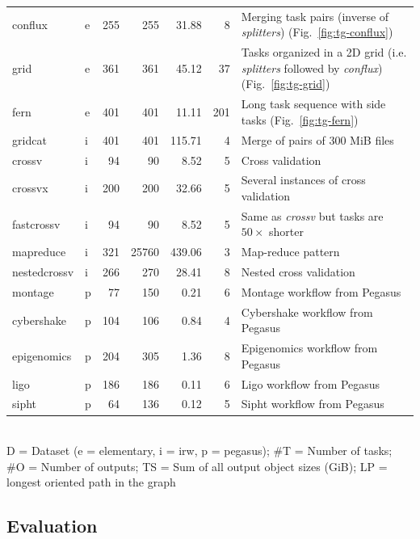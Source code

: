 \begin{table}
\begin{tabular}{l|lrrrr|T}
		conflux &   e &  255 &    255 &   31.88 &    8 &    Merging task pairs
		(inverse of \emph{splitters}) (Fig.~\ref{fig:tg-conflux}) \\
		grid &   e &  361 &    361 &   45.12 &   37 & Tasks organized in a 2D grid
		(i.e. \emph{splitters} followed by \emph{conflux}) (Fig.~\ref{fig:tg-grid})
		\\
		fern &   e &  401 &    401 &   11.11 &  201 &       Long task sequence with
		side tasks (Fig.~\ref{fig:tg-fern}) \\ \hline
		gridcat &   i &  401 &    401 &  115.71 &    4 & Merge of pairs of 300 MiB
		files  \\
		crossv &   i &   94 &     90 &    8.52 &    5 &  Cross validation \\
		crossvx &   i &  200 &    200 &   32.66 &    5 & Several instances of cross
		validation \\
		fastcrossv &   i &   94 &     90 &    8.52 &    5 & Same as \emph{crossv}
		but tasks are $50\times$ shorter \\
		mapreduce &   i &  321 &  25760 &  439.06 &    3 & Map-reduce pattern \\
		nestedcrossv &   i &  266 &    270 &   28.41 &    8 & Nested cross
		validation \\ \hline
		montage &   p &   77 &    150 &    0.21 &    6 &        Montage workflow
		from Pegasus \\
		cybershake &   p &  104 &    106 &    0.84 &    4 &        Cybershake
		workflow from Pegasus \\
		epigenomics &   p &  204 &    305 &    1.36 &    8 &        Epigenomics
		workflow from Pegasus \\
		ligo &   p &  186 &    186 &    0.11 &    6 &        Ligo workflow from
		Pegasus \\
		sipht &   p &   64 &    136 &    0.12 &    5 &        Sipht workflow from
		Pegasus \\
		\bottomrule
	\end{tabular}\\
	\vspace{2mm}
	D = Dataset (e = elementary, i = irw, p = pegasus);
	\#T = Number of tasks; \#O = Number of outputs;
	TS = Sum of all output object sizes (GiB);
	LP = longest oriented path in the graph
\end{table}

\subsection{Evaluation}

